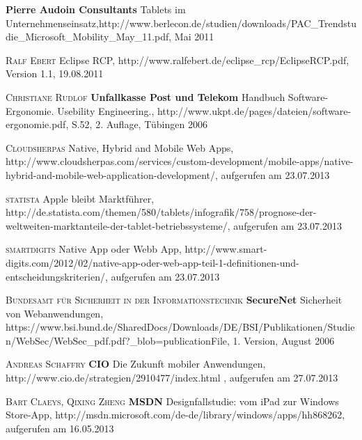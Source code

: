 \begin{thebibliography}{---}
                 \textbf{Pierre Audoin Consultants}
                 Tablets im Unternehmenseinsatz,http://www.berlecon.de/studien/downloads/PAC\_Trendstudie\_Microsoft\_Mobility\_May\_11.pdf,  Mai 2011
 
             
            
               \textsc{Ralf Ebert}
              Eclipse RCP, http://www.ralfebert.de/eclipse\_rcp/EclipseRCP.pdf, Version 1.1, 19.08.2011
  			
 			
           \textsc{Christiane Rudlof}
          \textbf{Unfallkasse Post und Telekom}
          Handbuch Software-Ergonomie. Usebility Engineering., http://www.ukpt.de/pages/dateien/software-ergonomie.pdf, S.52, 2. Auflage, Tübingen 2006

           \textsc{Cloudsherpas}
          Native, Hybrid and Mobile Web Apps, http://www.cloudsherpas.com/services/custom-development/mobile-apps/native-hybrid-and-mobile-web-application-development/, aufgerufen am 23.07.2013

           \textsc{statista}
          Apple bleibt Marktführer, http://de.statista.com/themen/580/tablets/infografik/758/prognose-der-weltweiten-marktanteile-der-tablet-betriebssysteme/, aufgerufen am 23.07.2013
          
           \textsc{smartdigits}
          Native App oder Webb App, http://www.smart-digits.com/2012/02/native-app-oder-web-app-teil-1-definitionen-und-entscheidungskriterien/, aufgerufen am 23.07.2013
          
           \textsc{Bundesamt für Sicherheit in der Informationstechnik}
           \textbf{SecureNet}
          Sicherheit von Webanwendungen, https://www.bsi.bund.de/SharedDocs/Downloads/DE/BSI/Publikationen/Studien/WebSec/WebSec\_pdf.pdf?\_blob=publicationFile, 1. Version, August 2006

           \textsc{Andreas Schaffry}
           \textbf{CIO}
          Die Zukunft mobiler Anwendungen, http://www.cio.de/strategien/2910477/index.html  , aufgerufen am 27.07.2013

           \textsc{Bart Claeys, Qixing Zheng}
          \textbf{MSDN}
          Designfallstudie: vom iPad zur Windows Store-App, http://msdn.microsoft.com/de-de/library/windows/apps/hh868262, aufgerufen am 16.05.2013
          

\end{thebibliography}

